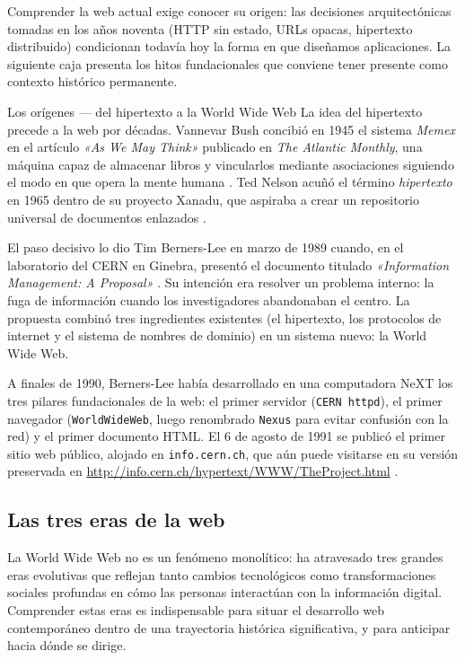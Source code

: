 \documentclass[11pt,a4paper,openany]{book}
\begin{document}
Comprender la web actual exige conocer su origen: las decisiones
arquitectónicas tomadas en los años noventa (HTTP sin estado, URLs
opacas, hipertexto distribuido) condicionan todavía hoy la forma en
que diseñamos aplicaciones. La siguiente caja presenta los hitos
fundacionales que conviene tener presente como contexto histórico
permanente.


\begin{cajahistoria}{Los orígenes --- del hipertexto a la World Wide Web}
La idea del hipertexto precede a la web por décadas. Vannevar Bush
concibió en 1945 el sistema \emph{Memex} en el artículo \emph{«As We
May Think»} publicado en \emph{The Atlantic Monthly}, una máquina
capaz de almacenar libros y vincularlos mediante asociaciones
siguiendo el modo en que opera la mente humana \cite{bush1945memex}.
Ted Nelson acuñó el término \emph{hipertexto} en 1965 dentro de su
proyecto Xanadu, que aspiraba a crear un repositorio universal de
documentos enlazados \cite{nelson1965xanadu}.

El paso decisivo lo dio Tim Berners-Lee en marzo de 1989 cuando, en el
laboratorio del CERN en Ginebra, presentó el documento titulado
\emph{«Information Management: A Proposal»} \cite{bernerslee1989}. Su
intención era resolver un problema interno: la fuga de información
cuando los investigadores abandonaban el centro. La propuesta combinó
tres ingredientes existentes (el hipertexto, los protocolos de internet
y el sistema de nombres de dominio) en un sistema nuevo: la World Wide
Web.

A finales de 1990, Berners-Lee había desarrollado en una computadora
NeXT los tres pilares fundacionales de la web: el primer servidor
(\texttt{CERN httpd}), el primer navegador (\texttt{WorldWideWeb},
luego renombrado \texttt{Nexus} para evitar confusión con la red) y el
primer documento HTML. El 6 de agosto de 1991 se publicó el primer
sitio web público, alojado en \texttt{info.cern.ch}, que aún puede
visitarse en su versión preservada en
\url{http://info.cern.ch/hypertext/WWW/TheProject.html}
\cite{cern1991firstsite}.
\end{cajahistoria}

\subsection{Las tres eras de la web}

La World Wide Web no es un fenómeno monolítico: ha atravesado tres
grandes eras evolutivas que reflejan tanto cambios tecnológicos como
transformaciones sociales profundas en cómo las personas interactúan
con la información digital. Comprender estas eras es indispensable
para situar el desarrollo web contemporáneo dentro de una trayectoria
histórica significativa, y para anticipar hacia dónde se dirige.
\end{document}
